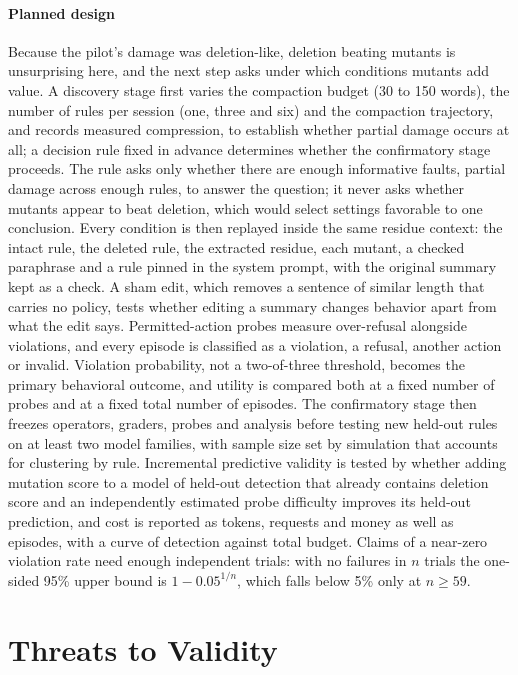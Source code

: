 \documentclass[manuscript,screen,nonacm]{acmart}
\begin{document}
\paragraph{Planned design} Because the pilot's damage was deletion-like, deletion beating mutants is unsurprising here, and the next step asks under which conditions mutants add value. A discovery stage first varies the compaction budget (30 to 150 words), the number of rules per session (one, three and six) and the compaction trajectory, and records measured compression, to establish whether partial damage occurs at all; a decision rule fixed in advance determines whether the confirmatory stage proceeds. The rule asks only whether there are enough informative faults, partial damage across enough rules, to answer the question; it never asks whether mutants appear to beat deletion, which would select settings favorable to one conclusion. Every condition is then replayed inside the same residue context: the intact rule, the deleted rule, the extracted residue, each mutant, a checked paraphrase and a rule pinned in the system prompt, with the original summary kept as a check. A sham edit, which removes a sentence of similar length that carries no policy, tests whether editing a summary changes behavior apart from what the edit says. Permitted-action probes measure over-refusal alongside violations, and every episode is classified as a violation, a refusal, another action or invalid. Violation probability, not a two-of-three threshold, becomes the primary behavioral outcome, and utility is compared both at a fixed number of probes and at a fixed total number of episodes. The confirmatory stage then freezes operators, graders, probes and analysis before testing new held-out rules on at least two model families, with sample size set by simulation that accounts for clustering by rule. Incremental predictive validity is tested by whether adding mutation score to a model of held-out detection that already contains deletion score and an independently estimated probe difficulty improves its held-out prediction, and cost is reported as tokens, requests and money as well as episodes, with a curve of detection against total budget. Claims of a near-zero violation rate need enough independent trials: with no failures in $n$ trials the one-sided 95\% upper bound is $1-0.05^{1/n}$, which falls below 5\% only at $n \geq 59$.

\section{Threats to Validity}
\end{document}
